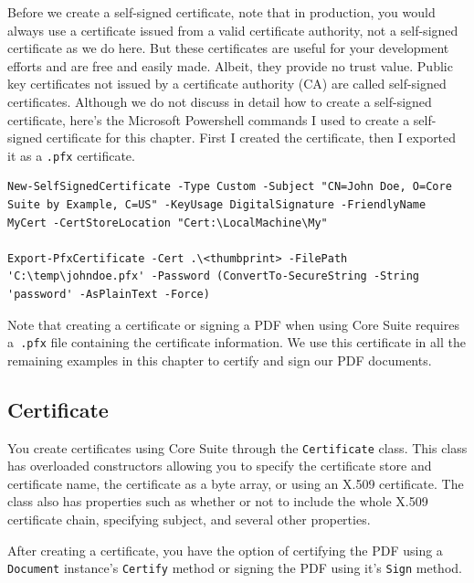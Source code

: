 \documentclass[american,letterpaper]{tufte-book}
\numberwithin{equation}{section}
\numberwithin{figure}{section}
\begin{document}
{Before we create a self-signed certificate, note that in production,
you would always use a certificate issued from a valid certificate
authority, not a self-signed certificate as we do here. But these
certificates are useful for your development efforts and are free
and easily made. Albeit, they provide no trust value. Public key certificates
not issued by a certificate authority (CA) are called self-signed
certificates. Although we do not discuss in detail how to create a self-signed
certificate, here's the Microsoft Powershell commands I used to create
a self-signed certificate for this chapter. First I created the certificate,
then I exported it as a \texttt{.pfx} certificate.

\bgroup{}
\begin{lstlisting}[basicstyle={\small\ttfamily},breaklines=true]
New-SelfSignedCertificate -Type Custom -Subject "CN=John Doe, O=Core Suite by Example, C=US" -KeyUsage DigitalSignature -FriendlyName MyCert -CertStoreLocation "Cert:\LocalMachine\My"

Export-PfxCertificate -Cert .\<thumbprint> -FilePath 'C:\temp\johndoe.pfx' -Password (ConvertTo-SecureString -String 'password' -AsPlainText -Force)
\end{lstlisting}
\leavevmode\egroup

Note that creating a certificate or signing a PDF when using Core
Suite requires a\texttt{ .pfx} file containing the certificate information.
We use this certificate in all the remaining examples in this chapter
to certify and sign our PDF documents.

\subsection{Certificate}

You create certificates using Core Suite through the \texttt{Certificate}
class. This class has overloaded constructors allowing you to specify
the certificate store and certificate name, the certificate as a byte
array, or using an X.509 certificate. The class also has properties
such as whether or not to include the whole X.509 certificate chain,
specifying subject, and several other properties.

After creating a certificate, you have the option of certifying the
PDF using a \texttt{Document} instance's \texttt{Certify} method or
signing the PDF using it's \texttt{Sign} method. 

}
\end{document}
